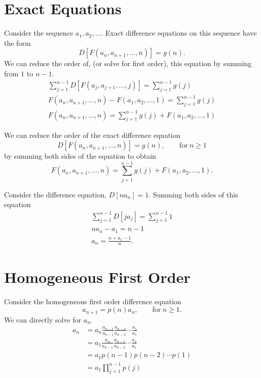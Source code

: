 \section{Exact Equations}
Consider the sequence $a_1, a_2, \ldots$.
Exact difference equations on this sequence have the form
\[ D[F(a_n, a_{n+1}, \ldots, n)] = g(n).\]
We can reduce the order of, (or solve for first order), 
this equation by summing from $1$ to $n-1$.
\begin{gather*}
  \sum_{j=1}^{n-1} D[F(a_j, a_{j+1}, \ldots, j)] = \sum_{j=1}^{n-1} g(j) \\
  F(a_n, a_{n+1}, \ldots, n) - F(a_1, a_2, \ldots, 1) = \sum_{j=1}^{n-1} g(j) \\
  F(a_n, a_{n+1}, \ldots, n) = \sum_{j=1}^{n-1} g(j) + F(a_1, a_2, \ldots, 1) 
\end{gather*}


\begin{Result}
  We can reduce the order of the exact difference equation
  \[ D[F(a_n, a_{n+1}, \ldots, n)] = g(n), \qquad \mathrm{for}\ n \geq 1\]
  by summing both sides of the equation to obtain
  \[F(a_n, a_{n+1}, \ldots, n) = \sum_{j=1}^{n-1} g(j) +F(a_1, a_2, \ldots, 1).\]
\end{Result}



\begin{Example} 
  Consider the difference equation, $D[n a_n] = 1$.   
  Summing both sides of this equation
  \begin{gather*} 
    \sum_{j=1}^{n-1} D[j a_j] = \sum_{j=1}^{n-1} 1 \\ 
    n a_n - a_1 = n-1 \\ 
    \boxed{ a_n = \frac{n + a_1 - 1}{n}.} 
  \end{gather*} 
\end{Example} 





\section{Homogeneous First Order} 
Consider the homogeneous first order difference equation
\[      a_{n+1} = p(n)a_n, \qquad \mathrm{for}\ n \geq 1. \] 
We can directly solve for $a_n$. 
\begin{align*} 
  a_n     &=     a_n \frac{a_{n-1}}{a_{n-1}} \frac{a_{n-2}}{a_{n-2}} \cdots  
  \frac{a_1}{a_1} \\ 
  &=     a_1 \frac{a_n}{a_{n-1}} \frac{a_{n-1}}{a_{n-2}} \cdots 
  \frac{a_2}{a_1}  \\ 
  &=     a_1 p(n-1)p(n-2) \cdots p(1) \\ 
  &=     a_1 \prod_{j=1}^{n-1} p(j) 
\end{align*} 



